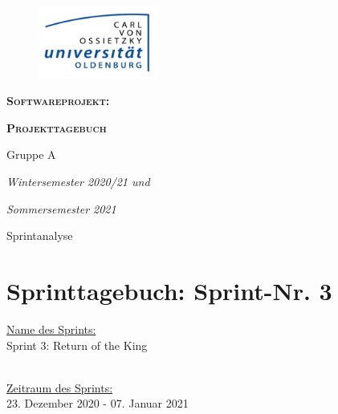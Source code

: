 \documentclass[12pt,a4paper, oneside]{article}
\author{Uni Oldenburg, SWP2020 Gruppe A}
\begin{document}
    \begin{titlepage}
        \pagestyle{empty}
        \begin{center}

            \begin{figure}[h]
                \centering
                \includegraphics[width=0.35\textwidth]{img/Logo.jpg}
            \end{figure}

            \bigskip \bigskip \noindent
            \textsc{\textbf{\LARGE Softwareprojekt:}} \par \bigskip \noindent
            \textsc{\textbf{\LARGE Projekttagebuch}}


            \par \bigskip \bigskip \bigskip \bigskip \bigskip \noindent
            {\Large Gruppe A} \par \medskip \noindent

            \par \bigskip \bigskip \bigskip \bigskip \bigskip \bigskip \noindent
            \textit{\Large Wintersemester 2020/21 und} \par \noindent
            \textit{\Large Sommersemester 2021}

            \par \bigskip \bigskip \bigskip \bigskip \bigskip \bigskip \noindent
            \par \bigskip \bigskip \bigskip \noindent
            {\Large Sprintanalyse} \par \medskip \noindent

        \end{center}
    \end{titlepage}

    \tableofcontents
    \pagebreak



    \section{Sprinttagebuch: Sprint-Nr. 3}
    \underline{Name des Sprints:}
    \\
    Sprint 3: Return of the King

    \noindent
    \\
    \underline{Zeitraum des Sprints:}
    \\
    23. Dezember 2020 - 07. Januar 2021
\end{document}
